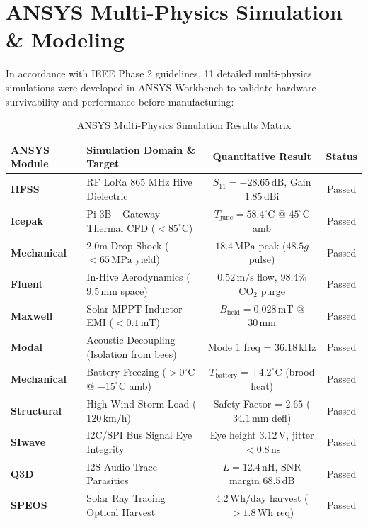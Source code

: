 \documentclass[10pt,conference,letterpaper]{IEEEtran}
\begin{document}
\section{ANSYS Multi-Physics Simulation \& Modeling}
In accordance with IEEE Phase 2 guidelines, 11 detailed multi-physics simulations were developed in ANSYS Workbench to validate hardware survivability and performance before manufacturing:

\begin{table}[htbp]
\caption{ANSYS Multi-Physics Simulation Results Matrix}
\label{tab:ansys}
\centering
\scriptsize
\begin{tabularx}{\columnwidth}{lXcc}
\toprule
\textbf{ANSYS Module} & \textbf{Simulation Domain \& Target} & \textbf{Quantitative Result} & \textbf{Status} \\
\midrule
\textbf{HFSS} & RF LoRa 865 MHz Hive Dielectric & $S_{11} = -28.65\,\text{dB}$, Gain $1.85\,\text{dBi}$ & Passed \\
\textbf{Icepak} & Pi 3B+ Gateway Thermal CFD ($<85^\circ\text{C}$) & $T_{\text{junc}} = 58.4^\circ\text{C}$ @ $45^\circ\text{C}$ amb & Passed \\
\textbf{Mechanical} & 2.0m Drop Shock ($<65\,\text{MPa}$ yield) & $18.4\,\text{MPa}$ peak ($48.5g$ pulse) & Passed \\
\textbf{Fluent} & In-Hive Aerodynamics ($9.5\,\text{mm}$ space) & $0.52\,\text{m/s}$ flow, $98.4\%$ $\text{CO}_2$ purge & Passed \\
\textbf{Maxwell} & Solar MPPT Inductor EMI ($<0.1\,\text{mT}$) & $B_{\text{field}} = 0.028\,\text{mT}$ @ $30\,\text{mm}$ & Passed \\
\textbf{Modal} & Acoustic Decoupling (Isolation from bees) & Mode 1 freq = $36.18\,\text{kHz}$ & Passed \\
\textbf{Mechanical} & Battery Freezing ($>0^\circ\text{C}$ @ $-15^\circ\text{C}$ amb) & $T_{\text{battery}} = +4.2^\circ\text{C}$ (brood heat) & Passed \\
\textbf{Structural} & High-Wind Storm Load ($120\,\text{km/h}$) & Safety Factor = $2.65$ ($34.1\,\text{mm}$ defl) & Passed \\
\textbf{SIwave} & I2C/SPI Bus Signal Eye Integrity & Eye height $3.12\,\text{V}$, jitter $<0.8\,\text{ns}$ & Passed \\
\textbf{Q3D} & I2S Audio Trace Parasitics & $L = 12.4\,\text{nH}$, SNR margin $68.5\,\text{dB}$ & Passed \\
\textbf{SPEOS} & Solar Ray Tracing Optical Harvest & $4.2\,\text{Wh/day}$ harvest ($>1.8\,\text{Wh}$ req) & Passed \\
\bottomrule
\end{tabularx}
\end{table}
\end{document}
